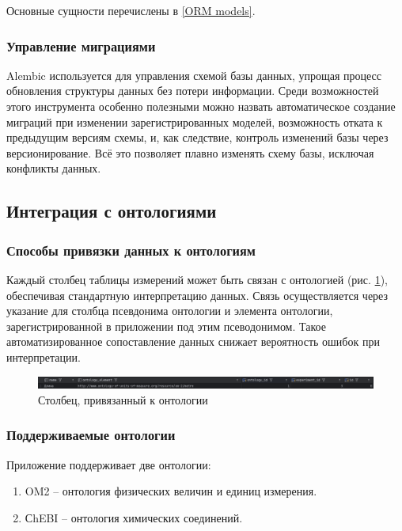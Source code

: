 Основные сущности перечислены в \ref{ORM models}.

\subsubsection{Управление миграциями}

Alembic используется для управления схемой базы данных, упрощая процесс обновления структуры данных без потери информации. Среди возможностей этого инструмента особенно полезными можно назвать автоматическое создание миграций при изменении зарегистрированных моделей, возможность отката к предыдущим версиям схемы, и, как следствие, контроль изменений базы через версионирование. Всё это позволяет плавно изменять схему базы, исключая конфликты данных.

\subsection{Интеграция с онтологиями}

\subsubsection{Способы привязки данных к онтологиям}

Каждый столбец таблицы измерений может быть связан с онтологией (рис. \ref{pic:linked_to_ontology_column}), обеспечивая стандартную интерпретацию данных.
Связь осуществляется через указание для столбца псевдонима онтологии и элемента онтологии, зарегистрированной в приложении под этим псеводонимом.
Такое автоматизированное сопоставление данных снижает вероятность ошибок при интерпретации.

\begin{figure}[H]
    \centering
    \includegraphics[width=\linewidth]{img/ontology_linking.png}
    \caption{Столбец, привязанный к онтологии}
    \label{pic:linked_to_ontology_column}
\end{figure}
\vspace{0.5cm}

\subsubsection{Поддерживаемые онтологии}

Приложение поддерживает две онтологии:
\begin{enumerate}
    \item OM2 -- онтология физических величин и единиц измерения.
    \item СhEBI -- онтология химических соединений.
\end{enumerate}

